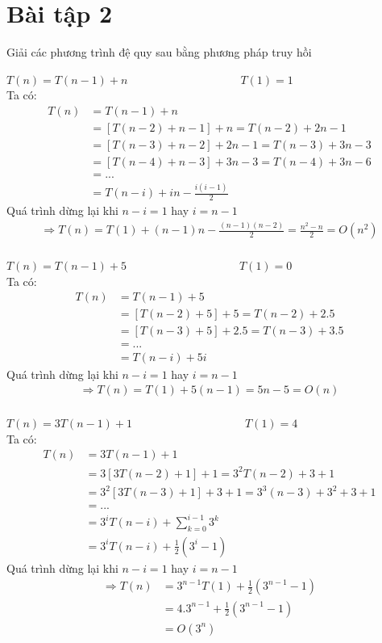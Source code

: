\documentclass[12pt, a4paper, fleqn]{article}
\begin{document}
\clearpage

\section*{Bài tập 2}
Giải các phương trình đệ quy sau bằng phương pháp truy hồi

$T(n) = T(n - 1) + n \qquad\qquad\qquad\qquad\qquad T(1) = 1$\\
Ta có:
\begin{align*}
T(n) &= T(n - 1) + n\\
&= \left[T(n - 2) + n - 1\right] + n = T(n - 2) + 2n - 1\\
&= \left[T(n - 3) + n - 2\right] + 2n - 1 = T(n - 3) + 3n - 3\\
&= \left[T(n - 4) + n - 3\right] + 3n - 3 = T(n - 4) + 3n - 6\\
&= ...\\
&= T(n - i) + in - \frac{i(i - 1)}{2}
\end{align*}
Quá trình dừng lại khi $n - i = 1$ hay $i = n - 1$
\begin{align*}
\Rightarrow T(n) = T(1) + (n - 1)n - \frac{(n - 1)(n - 2)}{2} = \frac{n ^ 2 - n}{2} = O(n ^ 2)\\
\end{align*}

$T(n) = T(n - 1) + 5 \qquad\qquad\qquad\qquad\qquad T(1) = 0$\\
Ta có:
\begin{align*}
T(n) &= T(n - 1) + 5\\
&= \left[T(n - 2) + 5\right] + 5 = T(n - 2) + 2.5\\
&= \left[T(n - 3) + 5\right] + 2.5 = T(n - 3) + 3.5\\
&= ...\\
&= T(n - i) + 5i
\end{align*}
Quá trình dừng lại khi $n - i = 1$ hay $i = n - 1$
\begin{align*}
\Rightarrow T(n) = T(1) + 5(n - 1) = 5n - 5 = O(n)\\
\end{align*}

$T(n) = 3T(n - 1) + 1 \qquad\qquad\qquad\qquad\qquad T(1) = 4$\\
Ta có:
\begin{align*}
T(n) &= 3T(n - 1) + 1\\
&= 3\left[3T(n - 2) + 1\right] + 1 = 3^2T(n - 2) + 3 + 1\\
&= 3^2\left[3T(n - 3) + 1\right] + 3 + 1 = 3^3(n - 3) + 3^2 + 3 + 1\\
&= ...\\
&= 3^iT(n - i) + \sum_{k=0}^{i-1}3^k\\
&= 3^iT(n - i) + \frac{1}{2}\left(3^i-1\right)
\end{align*}
Quá trình dừng lại khi $n - i = 1$ hay $i = n - 1$
\begin{align*}
\Rightarrow T(n) &=3^{n-1}T(1) + \frac{1}{2}\left(3^{n-1}-1\right)\\
&=4.3^{n-1}+ \frac{1}{2}\left(3^{n-1}-1\right)\\
&=O(3^n)
\end{align*}
\end{document}
